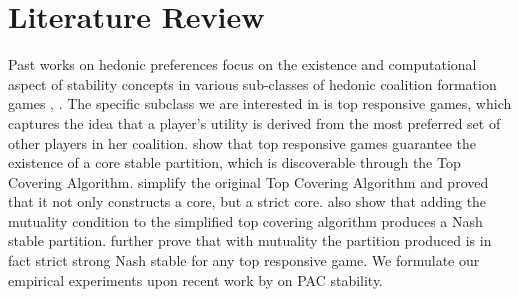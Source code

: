 \chapter{Literature Review}
\label{ch:review}

Past works on hedonic preferences focus on the existence and computational aspect
of stability concepts in various sub-classes of hedonic coalition formation games
\cite{Aziz:2012:ESH:2343776.2343806}, \cite{aziz_savani_moulin_2016}.
The specific subclass we are interested in is top responsive games,
which captures the idea that a player's utility is derived from
the most preferred set of other players in her coalition.
 show that top responsive games guarantee
the existence of a core stable partition,
which is discoverable through the Top Covering Algorithm.
 simplify the original Top Covering Algorithm
and proved that it not only constructs a core, but a strict core.
 also show that adding the mutuality condition
to the simplified top covering algorithm produces a Nash stable partition.
 further prove that with mutuality the partition produced
is in fact strict strong Nash stable for any top responsive game.
We formulate our empirical experiments upon recent work by  on PAC stability.
